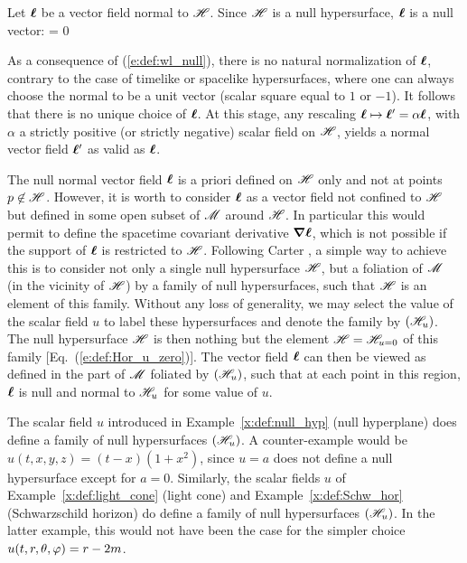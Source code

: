 Let $\bm{\ell}$ be a vector field normal to $\mathscr{H}$. Since $\mathscr{H}$ is a null hypersurface,
$\bm{\ell}$ is a null vector:
\be \label{e:def:wl_null}
    \wl\cdot\wl = 0
\ee
\begin{remark}
As a consequence of (\ref{e:def:wl_null}), there is no natural normalization
of $\bm{\ell}$, contrary to the case of timelike or spacelike hypersurfaces,
where one can always choose the normal to be a unit vector
(scalar square equal to $1$ or $-1$). It follows that there is no unique choice
of $\bm{\ell}$. At this stage, any rescaling $\bm{\ell} \mapsto \bm{\ell}' =  \alpha \bm{\ell}$, with
$\alpha$ a strictly positive (or strictly negative) scalar field on $\mathscr{H}$,
yields a normal vector field $\bm{\ell}'$ as valid as $\bm{\ell}$.
\end{remark}
The null normal vector field $\bm{\ell}$ is a priori defined on $\mathscr{H}$
only and not at points $p\not\in\mathscr{H}$.
However, it is worth to consider $\bm{\ell}$ as a vector field
not confined to $\mathscr{H}$ but defined
in some open subset of $\mathscr{M}$ around $\mathscr{H}$.
In particular this would permit to define the spacetime covariant
derivative $\bm{\nabla}\bm{\ell}$, which is not possible if the
support of $\bm{\ell}$ is restricted to $\mathscr{H}$.
Following Carter \cite{Carte97}, a simple way to achieve
this is to consider not only a single null hypersurface $\mathscr{H}$,
but a foliation of $\mathscr{M}$ (in the vicinity
of $\mathscr{H}$) by a family of null hypersurfaces, such that $\mathscr{H}$ is an
element of this family.
Without any loss of generality,
we may select the value of the scalar field $u$ to label these hypersurfaces and
denote the family by $(\mathscr{H}_u)$. The null hypersurface $\mathscr{H}$
is then nothing but the element $\mathscr{H} = \mathscr{H}_{u=0}$ of this family
[Eq.~(\ref{e:def:Hor_u_zero})].
The vector field $\bm{\ell}$ can then be viewed as defined in the part of $\mathscr{M}$
foliated by $(\mathscr{H}_u)$, such that at each point in this region, $\bm{\ell}$
is null and normal to $\mathscr{H}_u$ for some value of $u$.

\begin{example}
The scalar field $u$ introduced in Example~\ref{x:def:null_hyp}
(null hyperplane) does define a family of null hypersurfaces
$(\mathscr{H}_u)$. A counter-example would be $u(t,x,y,z)=(t-x)(1+x^2)$, since
$u=a$ does not define a null hypersurface except for $a=0$.
Similarly, the scalar fields $u$ of
Example~\ref{x:def:light_cone} (light cone)
and Example~\ref{x:def:Schw_hor} (Schwarzschild horizon)
do define a family of null
hypersurfaces $(\mathscr{H}_u)$. In the latter example, this would not have been the
case for the simpler choice $u(t,r,\theta,\varphi)  = r - 2m$.
\end{example}

